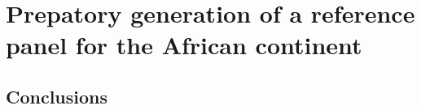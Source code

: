 \chapter{Prepatory generation of a reference panel for the African continent}
\label{ch:reference_panel}









\section{Conclusions}
